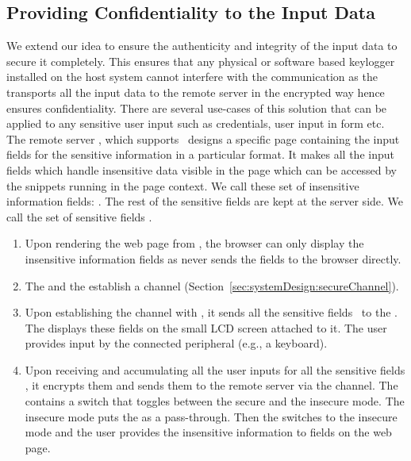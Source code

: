 \subsection{Providing Confidentiality to the Input Data}
\label{sec:systemDesign:secureChannel:confidentiality}

We extend our idea to ensure the authenticity and integrity of the input data to secure it completely. This ensures that any physical or software based keylogger installed on the host system cannot interfere with the communication as the \device transports all the input data to the remote server in the encrypted way hence ensures confidentiality. There are several use-cases of this solution that can be applied to any sensitive user input such as credentials, user input in \html form etc. The remote server \server, which supports \webusb\, designs a specific page containing the input fields for the sensitive information in a particular format. It makes all the input fields which handle insensitive data visible in the \html page which can be accessed by the \js snippets running in the page context. We call these set of insensitive information fields: \insensitive. The rest of the sensitive fields are kept at the server side. We call the set of sensitive fields \sensitive.

\begin{enumerate}
  \item Upon rendering the web page from \server, the browser can only display the insensitive information fields \insensitive as \server never sends the \sensitive fields to the browser directly.
  
  \item The \device and the \server establish a \tls channel (Section~\ref{sec:systemDesign:secureChannel}).
  
  \item Upon establishing the \tls channel with \server, it sends all the sensitive fields \sensitive\ to the \device. The \device displays these fields on the small LCD screen attached to it. The user provides input by the connected peripheral (e.g., a keyboard).
  
  \item Upon receiving and accumulating all the user inputs for all the sensitive fields \sensitive, it encrypts them and sends them to the remote server via the \tls channel. The \device contains a switch that toggles between the secure and the insecure mode. The insecure mode puts the \device as a \usb pass-through. 
  Then the \device switches to the insecure mode and the user 
  provides the insensitive information to \insensitive fields on the web page.

\end{enumerate}

